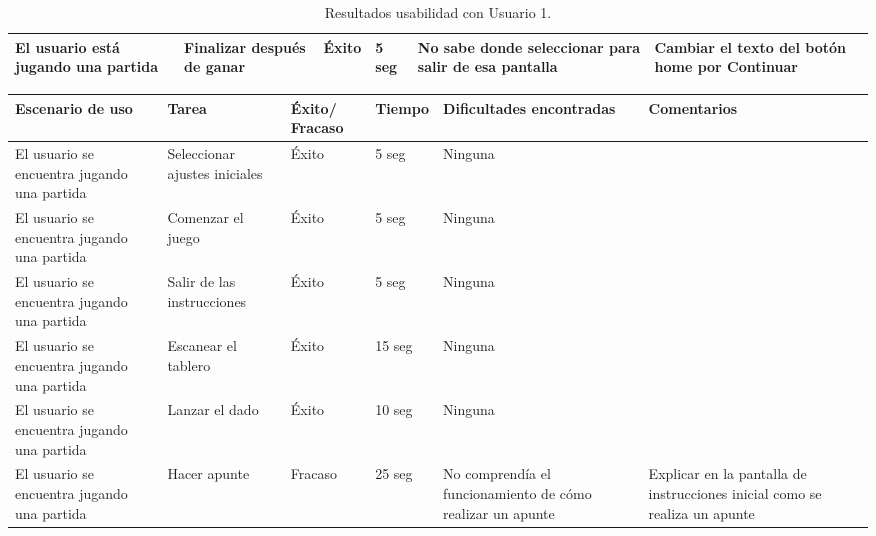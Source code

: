 \begin{table}[!h]
\begin{center}
\begin{tabular}{|p{2.2cm}|p{1.9cm}|p{1.4cm}|p{1.2cm}|p{3.1cm}|p{3.1cm}|}
      \hline
      El usuario está jugando una partida
      & Finalizar después de ganar
      & Éxito
      & 5 seg
      & No sabe donde seleccionar para salir de esa pantalla
      & Cambiar el texto del botón home por Continuar\\

      \hline

    \end{tabular}

    \caption{Resultados usabilidad con Usuario 1.}
    \label{tabla-bocetos-usuario1}

  \end{center}
\end{table}


\begin{table}[h]
  \begin{center}
    \begin{tabular}{|p{2.5cm}|p{1.75cm}|p{1.25cm}|p{1.25cm}|p{2.75cm}|p{3.5cm}|}

      \hline
        \rowcolor{Gray} \textbf{Escenario de uso}
        & \textbf{Tarea}
        & \textbf{Éxito/ Fracaso}
        & \textbf{Tiempo}
        & \textbf{Dificultades encontradas}
        & \textbf{Comentarios}\\

      \hline
      El usuario se encuentra jugando una partida
      & Seleccionar ajustes iniciales
      & Éxito
      & 5 seg
      & Ninguna
      &\\

      \hline
      El usuario se encuentra jugando una partida
      & Comenzar el juego
      & Éxito
      & 5 seg
      & Ninguna
      &\\

      \hline
      El usuario se encuentra jugando una partida
      & Salir de las instrucciones
      & Éxito
      & 5 seg
      & Ninguna
      &\\

      \hline
      El usuario se encuentra jugando una partida
      & Escanear el tablero
      & Éxito
      & 15 seg
      & Ninguna
      &\\

      \hline
      El usuario se encuentra jugando una partida
      & Lanzar el dado
      & Éxito
      & 10 seg
      & Ninguna
      & \\

      \hline
      El usuario se encuentra jugando una partida
      & Hacer apunte
      & Fracaso
      & 25 seg
      & No comprendía el funcionamiento de cómo realizar un apunte
      & Explicar en la pantalla de instrucciones inicial como se realiza un apunte\\


\end{tabular}
\end{center}
\end{table}
